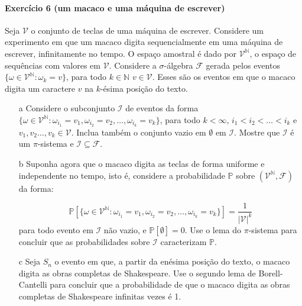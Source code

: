 \documentclass[10pt,a4paper]{article}
\begin{document}
		\paragraph{Exercício 6 (um macaco e uma máquina de escrever)} Seja $\mathcal{V}$ o conjunto de teclas de uma máquina de escrever. Considere um experimento em que um macaco digita sequencialmente em uma máquina de escrever, infinitamente no tempo. O espaço amostral é dado por $\mathcal{V}^{\mathbb{N}}$, o espaço de sequências com valores em $\mathcal{V}$. Considere a $\sigma$-álgebra $\mathcal{F}$ gerada pelos eventos $\{\omega \in \mathcal{V}^{\mathbb{N}}: \omega_k = v\}$, para todo $k \in \mathbb{N}$ $v \in \mathcal{V}$. Esses são os eventos em que o macaco digita um caractere $v$ na $k$-ésima posição do texto.
		\begin{itemize}
			\item[a] Considere o subconjunto $\mathcal{I}$ de eventos da forma $\{\omega \in \mathcal{V}^{\mathbb{N}} : \omega_{i_1} = v_1 , \omega_{i_2} = v_2,\ldots, \omega_{i_k} = v_k\}$, para todo $k<\infty$, $i_1 < i_2 < \ldots < i_k$ e $v_1,v_2\ldots, v_k \in \mathcal{V}$. Inclua também o conjunto vazio em $\emptyset$ em $\mathcal{I}$. Mostre que $\mathcal{I}$ é um $\pi$-sistema e $\mathcal{I}\subseteq \mathcal{F}$.
			\item[b] Suponha agora que o macaco digita as teclas de forma uniforme e independente no tempo, isto é, considere a probabilidade $\mathbb{P}$ sobre $(\mathcal{V}^{\mathbb{N}}, \mathcal{F})$ da forma:
			
			$$\mathbb{P}[\{\omega \in \mathcal{V}^{\mathbb{N}} : \omega_{i_1} = v_1 , \omega_{i_2} = v_2,\ldots, \omega_{i_k} = v_k\}] = \frac{1}{|\mathcal{V}|^k}$$
			para todo evento em $\mathcal{I}$ não vazio, e $\mathbb{P}[\emptyset] = 0$. Use o lema do $\pi$-sistema para concluir que as probabilidades sobre $\mathcal{I}$ caracterizam $\mathbb{P}$.
			\item[c] Seja $S_n$ o evento em que, a partir da enésima posição do texto, o macaco digita as obras completas de Shakespeare. Use o segundo lema de Borell-Cantelli para concluir que a probabilidade de que o macaco digita as obras completas de Shakespeare infinitas vezes é 1.
		\end{itemize}
		
\end{document}
